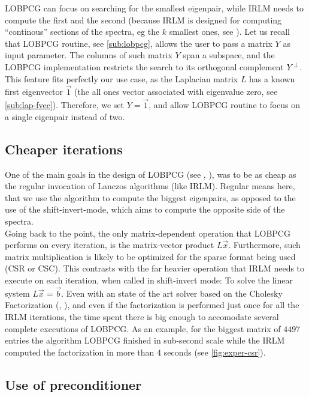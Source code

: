 \gls{LOBPCG} can focus on searching for the smallest eigenpair, while
\gls{IRLM} needs to compute the first and the 
second (because \gls{IRLM} is designed for computing ``continous''
sections of the spectra, eg the $k$ smallest ones, see
\cite{arpack}). Let us recall that 
\gls{LOBPCG} routine, see \cref{sub:lobpcg}, allows the user to pass a
matrix $Y$ as input parameter. The columns of such matrix $Y$ span a
subspace, and the \gls{LOBPCG} implementation restricts the search to its orthogonal
complement ${Y}^{\bot}$. This feature fits perfectly our use case, as 
the Laplacian matrix $L$ has a known first eigenvector $\vec{1}$ (the all
ones vector associated with eigenvalue zero, see
\cref{sub:lap-fvec}). Therefore, we set $Y = \vec{1}$,
and allow \gls{LOBPCG} routine to focus on a single eigenpair instead of two.

\subsection{Cheaper iterations}

One of the main goals in the design of \gls{LOBPCG} (see
\cite{knyazev01}, \cite{knyazev03}),
was to be as cheap as the regular invocation of Lanczos
algorithms (like \gls{IRLM}). Regular means here, that
we use the algorithm to compute the biggest eigenpairs, as opposed to
the use of the shift-invert-mode, which aims to compute the opposite
side of the spectra. \\

Going back to the point, the
only matrix-dependent operation that \gls{LOBPCG} performs on every
iteration, is the matrix-vector product $L\vec{x}$. Furthermore, such matrix
multiplication is likely to be optimized for the sparse format being
used (CSR or CSC). This contrasts with the far heavier operation that
\gls{IRLM} needs to execute on each iteration, when called in
shift-invert mode: To solve the linear system $L\vec{x} =
\vec{b}$. Even with an state of the art solver based on the Cholesky
Factorization (\cite{cholmod08}, \cite{cholmod08a}), and even if
the factorization is performed just once for all the \gls{IRLM}
iterations, the time spent there is big enough to accomodate several
complete executions of \gls{LOBPCG}. As an example, for the biggest
matrix of $4497$ entries the algorithm \gls{LOBPCG} finished in
sub-second scale while the \gls{IRLM} computed the factorization in
more than 4 seconds (see \cref{fig:exper-csr}).


\subsection{Use of preconditioner}

